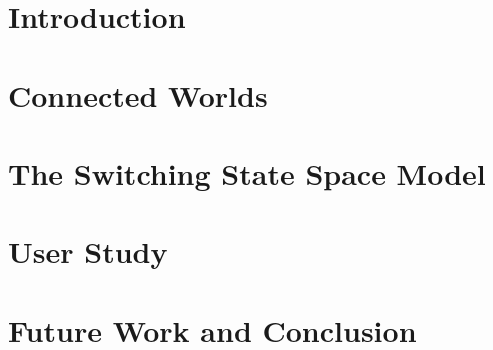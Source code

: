 \documentclass[11pt]{gsasthesis} %
\begin{document}

\chapter*{Introduction}\label{ch:intro}



\chapter{Connected Worlds}\label{ch:1}




\chapter{The Switching State Space Model}\label{ch:2}




\chapter{User Study}\label{ch:3}




\chapter{Future Work and Conclusion}\label{ch:4}




\begin{singlespacing}
  \renewcommand{\bibname}{References}

  
  
\end{singlespacing}


\end{document}
